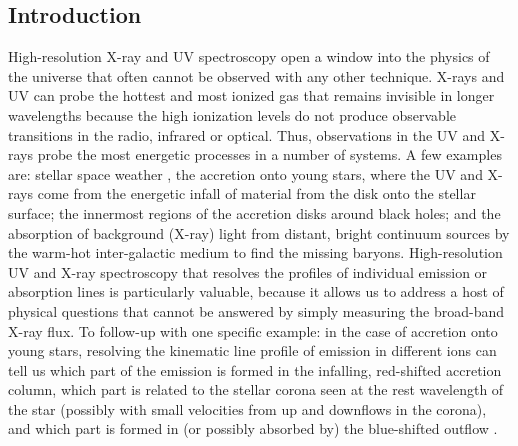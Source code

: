 \documentclass[12pt]{spieman}  %
\begin{document}
\begin{spacing}{2}   %


\section{Introduction}
\label{sect:intro}  %
High-resolution X-ray and UV spectroscopy open a window into the physics of the universe that often cannot be observed with any other technique. X-rays and UV can probe the hottest and most ionized gas that remains invisible in longer wavelengths because the high ionization levels do not produce observable transitions in the radio, infrared or optical. Thus, observations in the UV and X-rays probe the most energetic processes in a number of systems. A few examples are: stellar space weather \cite{2022AN....34320019B}, the accretion onto young stars, where the UV and X-rays come from the energetic infall of material from the disk onto the stellar surface; the innermost regions of the accretion disks around black holes; and the absorption of background (X-ray) light from distant, bright continuum sources by the warm-hot inter-galactic medium to find the missing baryons\cite{10.1117/12.2231193,10.1117/12.2529499}. High-resolution UV and X-ray spectroscopy that resolves the profiles of individual emission or absorption lines is particularly valuable, because it allows us to address a host of physical questions that cannot be answered by simply measuring the broad-band X-ray flux.
To follow-up with one specific example: in the case of accretion onto young stars, resolving the kinematic line profile of emission in different ions can tell us which part of the emission is formed in the infalling, red-shifted accretion column, which part is related to the stellar corona seen at the rest wavelength of the star (possibly with small velocities from up and downflows in the corona), and which part is formed in (or possibly absorbed by) the blue-shifted outflow \cite{10.1117/12.2529499}.


\end{spacing}
\end{document}
